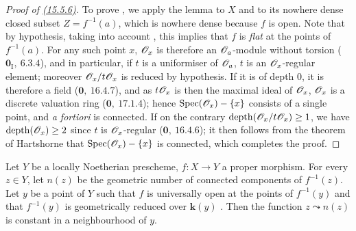 \begin{proof}[Proof of {\rm {\hyperref[IV.15.5.6]{(15.5.6)}}}]
To prove , we apply the lemma  to $X$ and to its nowhere dense closed subset $Z=f^{-1}(a)$, which is nowhere dense because $f$ is open.
Note that by hypothesis, taking into account , this implies that $f$ is \emph{flat} at the points of $f^{-1}(a)$.
For any such point $x$, $\mathscr{O}_x$ is therefore an $\mathscr{O}_a$-module without torsion ($\mathbf{0}_{\mathrm{I}},~6.3.4$), and in particular, if $t$ is a uniformiser of $\mathscr{O}_a$, $t$ is an $\mathscr{O}_x$-regular element; moreover $\mathscr{O}_x/t\mathscr{O}_x$ is reduced by hypothesis. If it is of depth $0$, it is therefore a field ($\mathbf{0},~16.4.7$), and as $t\mathscr{O}_x$ is then the maximal ideal of $\mathscr{O}_x$, $\mathscr{O}_x$ is a discrete valuation ring ($\mathbf{0},~17.1.4$); hence $\operatorname{Spec}(\mathscr{O}_x)-\{x\}$ consists of a single point, and \emph{a fortiori} is connected.
If on the contrary $\operatorname{depth}(\mathscr{O}_x/t\mathscr{O}_x)\geq 1$, we have $\operatorname{depth}(\mathscr{O}_x)\geq 2$ since $t$ is $\mathscr{O}_x$-regular ($\mathbf{0},~16.4.6$); it then follows from the theorem of Hartshorne  that $\operatorname{Spec}(\mathscr{O}_x)-\{x\}$ is connected, which completes the proof.
\end{proof}

\begin{proposition}[15.5.7]
\label{IV.15.5.7}
Let $Y$ be a locally Noetherian prescheme, $f:X\to Y$ a proper morphism.
For every $z\in Y$, let $n(z)$ be the geometric number of connected components of $f^{-1}(z)$.
Let $y$ be a point of $Y$ such that $f$ is universally open at the points of $f^{-1}(y)$ and that $f^{-1}(y)$ is geometrically reduced over $\boldsymbol{k}(y)$ .
Then the function $z\leadsto n(z)$ is constant in a neighbourhood of $y$.
\end{proposition}

